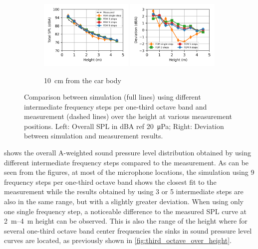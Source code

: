 \begin{figure}
	\begin{subfigure}[b]{\textwidth}
		\centering
		\includegraphics[width=0.49\textwidth]{fig/chap5/freq_steps/overall_SPL/pos_f.png}
		\includegraphics[width=0.49\textwidth]{fig/chap5/freq_steps/overall_SPL/pos_f_deviation.png}
		\caption{\SI{10}{\centi\meter} from the car body}
	\end{subfigure}
	\caption{Comparison between simulation (full lines) using different intermediate frequency steps per one-third octave band and measurement (dashed lines) over the height at various measurement positions. Left: Overall SPL in dBA ref \SI{20}{\micro\pascal}; Right: Deviation between simulation and measurement results.}
	\label{fig:overall_SPL_freq_steps}
\end{figure}

 shows the overall A-weighted sound pressure level distribution obtained by using different intermediate frequency steps compared to the measurement.
As can be seen from the figures, at most of the microphone locations, the simulation using 9 frequency steps per one-third octave band shows the closest fit to the measurement while the results obtained by using 3 or 5 intermediate steps are also in the same range, but with a slightly greater deviation.
When using only one single frequency step, a noticeable difference to the measured SPL curve at \SIrange{2}{4}{\meter} height can be observed. This is also the range of the height where for several one-third octave band center frequencies the sinks in sound pressure level curves are located, as previously shown in \cref{fig:third_octave_over_height}.

